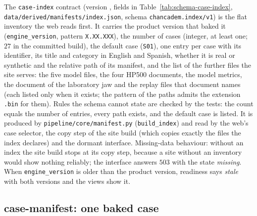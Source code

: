 The \texttt{case-index} contract (version , fields in Table~\ref{tab:schema-case-index}, \texttt{data/\allowbreak{}derived/\allowbreak{}manifests/\allowbreak{}index.json}, schema
\texttt{chancadem.index/\allowbreak{}v1}) is the flat inventory the web reads first. It carries the product version that baked it
(\texttt{engine\_version}, pattern \texttt{X.XX.XXX}), the number of cases (integer, at least one; $27$ in the committed build),
the default case (\texttt{S01}), one entry per case with its identifier, its title and category in English and Spanish, whether
it is real or synthetic and the relative path of its manifest, and the list of the further files the site serves: the five
model files, the four HP500 documents, the model metrics, the document of the laboratory jaw and the replay files that document names (each listed only when it exists; the pattern of the paths admits the extension \texttt{.bin} for them). Rules the schema cannot state are checked by the tests: the count
equals the number of entries, every path exists, and the default case is listed. It is produced by
\texttt{pipeline/\allowbreak{}core/\allowbreak{}manifest.py} (\texttt{build\_index}) and read by the web's case selector, the copy step of the site build
(which copies exactly the files the index declares) and the dormant interface. Missing-data behaviour: without an index the site
build stops at its copy step, because a site without an inventory would show nothing reliably; the interface answers $503$ with
the state \emph{missing}. When \texttt{engine\_version} is older than the product version, readiness says \emph{stale} with both
versions and the views show it.

\subsection{case-manifest: one baked case}\label{sec:data-manifest}

